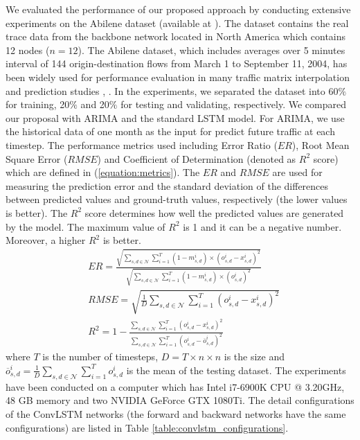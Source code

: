 We evaluated the performance of our proposed approach by conducting extensive experiments on the Abilene dataset (available at \cite{zhang2011abilene}). The dataset contains the real trace data from the backbone network located in North America which contains 12 nodes ($n = 12$). The Abilene dataset, which includes averages over 5 minutes interval of 144 origin-destination flows from March 1 to September 11, 2004, has been widely used for performance evaluation in many traffic matrix interpolation and prediction studies \cite{xie2015sequential}, \cite{xie2016accurate}. In the experiments, we separated the dataset into 60$\%$ for training, 20$\%$ and 20$\%$ for testing and validating, respectively. We compared our proposal with ARIMA \cite{box2015time} and the standard LSTM model. For ARIMA, we use the historical data of one month as the input for predict future traffic at each timestep. The performance metrics used including Error Ratio ($ER$), Root Mean Square Error ($RMSE$) and Coefficient of Determination (denoted as $R^2$ score) which are defined in (\ref{equation:metrics}). The $ER$ and $RMSE$ are used for measuring the prediction error and the standard deviation of the differences between predicted values and ground-truth values, respectively (the lower values is better). The $R^2$ score determines how well the predicted values are generated by the model. The maximum value of $R^2$ is 1 and it can be a negative number. Moreover, a higher $R^2$ is better.  
\begin{equation}
\label{equation:metrics}
\begin{aligned}
&ER = \frac{\sqrt{\sum_{s,d \in \mathcal{N}}\sum_{i=1}^T{(1-m^i_{s,d})\times(o_{s,d}^i - x_{s,d}^i)^2}}}{\sqrt{\sum_{s,d \in \mathcal{N}}\sum_{i=1}^T{(1-m^i_{s,d})\times(o^i_{s,d})^2}}} \\
&RMSE=\sqrt{\frac{1}{D}\sum_{s,d \in \mathcal{N}}\sum_{i=1}^T{(o^i_{s,d} - x^i_{s,d})^2}}\\
&R^2=1-\frac{\sum_{s,d \in \mathcal{N}}\sum_{i=1}^{T}{(o^i_{s,d}-x_{s,d}^i)^2}}{\sum_{s,d \in \mathcal{N}}\sum_{i=1}^{T}{(o^i_{s,d}-\overline{o}_{s,d}^i)^2}}
\end{aligned}
\end{equation}
where $T$ is the number of timesteps, $D = T \times n \times n$ is the size and $\overline{o}_{s,d}^i = \frac{1}{D}\sum_{s,d \in \mathcal{N}}\sum_{i=1}^{T}{o^i_{s,d}}$ is the mean of the testing dataset. 
The experiments have been conducted on a computer which has Intel i7-6900K CPU @ 3.20GHz, 48 GB memory and two NVIDIA GeForce GTX 1080Ti. The detail configurations of the ConvLSTM networks (the forward and backward networks have the same configurations) are listed in Table \ref{table:convlstm_configurations}.

